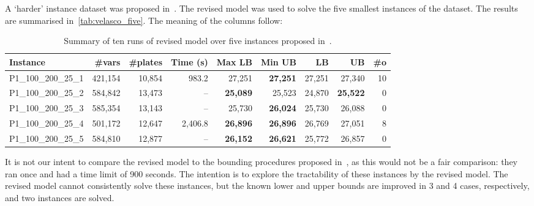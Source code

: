 \documentclass[smallextended]{svjour3}       %
\begin{document}
A `harder' instance dataset was proposed in~\cite{velasco:2019}.
The revised model was used to solve the five smallest instances of the dataset.
The results are summarised in~\autoref{tab:velasco_five}. The meaning of the columns follow:

\begin{table}
\caption{Summary of ten runs of revised model over five instances proposed in~\cite{velasco:2019}.}
\setlength\tabcolsep{2.5px}
\begin{tabular}{lrrrrrrrr}
Instance & \#vars & \#plates & Time (s)& Max LB & Min UB & \cite{velasco:2019} LB & \cite{velasco:2019} UB & \#o\\
\hline
P1\_100\_200\_25\_1 & 421,154 & 10,854 & 983.2 & 27,251 & \bf{27,251} & 27,251 & 27,340 & 10 \\
P1\_100\_200\_25\_2 & 584,842 & 13,473 & -- & \bf{25,089} & 25,523 & 24,870 & \bf{25,522} & 0 \\
P1\_100\_200\_25\_3 & 585,354 & 13,143 & -- & 25,730 & \bf{26,024} & 25,730 & 26,088 & 0 \\
P1\_100\_200\_25\_4 & 501,172 & 12,647 & 2,406.8 & \bf{26,896} & \bf{26,896} & 26,769 & 27,051 & 8 \\
P1\_100\_200\_25\_5 & 584,810 & 12,877 & -- & \bf{26,152} & \bf{26,621} & 25,772 & 26,857 & 0 \\
\hline
\end{tabular}
\label{tab:velasco_five}
\end{table}

It is not our intent to compare the revised model to the bounding procedures proposed in~\cite{velasco:2019}, as this would not be a fair comparison: they ran once and had a time limit of 900 seconds.
The intention is to explore the tractability of these instances by the revised model.
The revised model cannot consistently solve these instances, but the known lower and upper bounds are improved in 3 and 4 cases, respectively, and two instances are solved.
\end{document}

